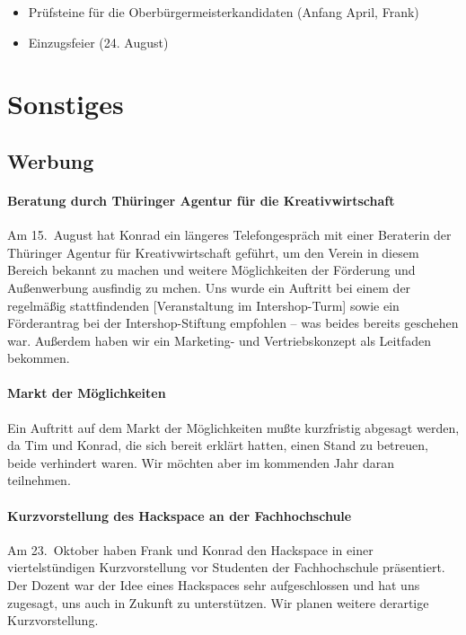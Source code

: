 \documentclass[10pt,DIV16]{scrartcl}
\begin{document}
\begin{itemize}
	\item Prüfsteine für die Oberbürgermeisterkandidaten (Anfang April, Frank)
	\item Einzugsfeier (24. August)
\end{itemize}



\section{Sonstiges}

\subsection{Werbung}

\paragraph{Beratung durch Thüringer Agentur für die Kreativwirtschaft}

Am 15.~August hat Konrad ein längeres Telefongespräch mit einer Beraterin der
Thüringer Agentur für Kreativwirtschaft geführt, um den Verein in diesem
Bereich bekannt zu machen und weitere Möglichkeiten der Förderung und
Außenwerbung ausfindig zu mchen.  Uns wurde ein Auftritt bei einem der
regelmäßig stattfindenden [Veranstaltung im Intershop-Turm] sowie ein
Förderantrag bei der Intershop-Stiftung empfohlen -- was beides bereits
geschehen war.  Außerdem haben wir ein Marketing- und Vertriebskonzept als
Leitfaden bekommen.

\paragraph{Markt der Möglichkeiten}

Ein Auftritt auf dem Markt der Möglichkeiten mußte kurzfristig abgesagt
werden, da Tim und Konrad, die sich bereit erklärt hatten, einen Stand zu
betreuen, beide verhindert waren.  Wir möchten aber im kommenden Jahr daran
teilnehmen.

\paragraph{Kurzvorstellung des Hackspace an der Fachhochschule}

Am 23.~Oktober haben Frank und Konrad den Hackspace in einer viertelstündigen
Kurzvorstellung vor Studenten der Fachhochschule präsentiert.  Der Dozent war
der Idee eines Hackspaces sehr aufgeschlossen und hat uns zugesagt, uns auch
in Zukunft zu unterstützen.  Wir planen weitere derartige Kurzvorstellung.
\end{document}
